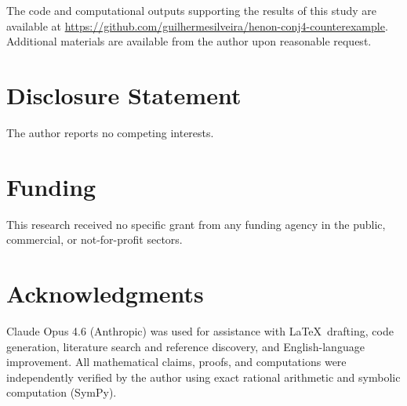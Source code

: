 \documentclass[11pt]{article}
\theoremstyle{definition}
\theoremstyle{remark}
\begin{document}
The code and computational outputs supporting the results of this study are available at
\url{https://github.com/guilhermesilveira/henon-conj4-counterexample}. Additional
materials are available from the author upon reasonable request.


\section*{Disclosure Statement}

The author reports no competing interests.


\section*{Funding}

This research received no specific grant from any funding agency in the public,
commercial, or not-for-profit sectors.


\section*{Acknowledgments}

Claude Opus 4.6 (Anthropic) was used for assistance with \LaTeX\ drafting,
code generation, literature search and reference discovery, and
English-language improvement. All mathematical claims, proofs, and computations
were independently verified by the author using exact rational arithmetic and
symbolic computation (SymPy).



\end{document}
